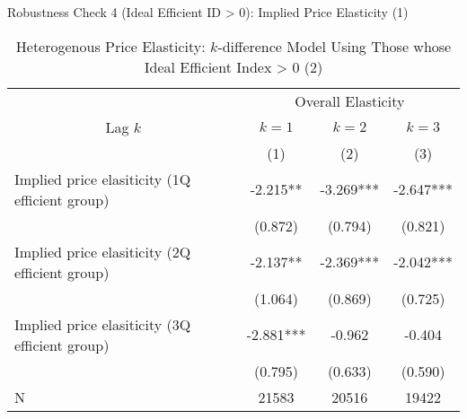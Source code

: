 \documentclass[
  ignorenonframetext,
]{beamer}
\begin{document}
\begin{frame}{Robustness Check 4 (Ideal Efficient ID \textgreater{} 0): Implied Price Elasticity (1)}
\protect\hypertarget{robustness-check-4-ideal-efficient-id-0-implied-price-elasticity-1}{}
\begin{table}

\caption{\label{tab:kableSubsetHeterokDiffElasticitySlide2}Heterogenous Price Elasticity: $k$-difference Model Using Those whose Ideal Efficient Index > 0 (2)}
\centering
\fontsize{8}{10}\selectfont
\begin{tabular}[t]{lccc}
\toprule
\multicolumn{1}{c}{ } & \multicolumn{3}{c}{Overall Elasticity} \\
\cmidrule(l{3pt}r{3pt}){2-4}
\multicolumn{1}{c}{Lag $k$} & \multicolumn{1}{c}{$k = 1$} & \multicolumn{1}{c}{$k = 2$} & \multicolumn{1}{c}{$k = 3$} \\
\cmidrule(l{3pt}r{3pt}){1-1} \cmidrule(l{3pt}r{3pt}){2-2} \cmidrule(l{3pt}r{3pt}){3-3} \cmidrule(l{3pt}r{3pt}){4-4}
 & (1) & (2) & (3)\\
\midrule
Implied price elasiticity (1Q efficient group) & -2.215** & -3.269*** & -2.647***\\
 & (0.872) & (0.794) & (0.821)\\
Implied price elasiticity (2Q efficient group) & -2.137** & -2.369*** & -2.042***\\
 & (1.064) & (0.869) & (0.725)\\
Implied price elasiticity (3Q efficient group) & -2.881*** & -0.962 & -0.404\\
 & (0.795) & (0.633) & (0.590)\\
N & 21583 & 20516 & 19422\\
\bottomrule
\end{tabular}
\end{table}
\end{frame}
\end{document}
